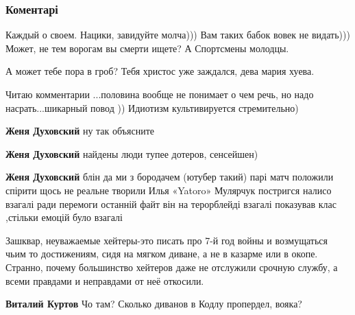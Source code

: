 
 
 
 
 
\subsubsection{Коментарі}

\begin{itemize} %

Каждый о своем. Нацики, завидуйте молча))) Вам таких бабок вовек не видать)))
Может, не тем ворогам вы смерти ищете? А Спортсмены молодцы.

\begin{itemize} %
А может тебе пора в гроб? Тебя христос уже заждался, дева мария хуева.
\end{itemize} %


Читаю комментарии ...половина вообще не понимает о чем речь, но надо
насрать...шикарный повод )) Идиотизм культивируется стремительно)

\begin{itemize} %
\textbf{Женя Духовский} ну так объясните

\textbf{Женя Духовский} найдены люди тупее дотеров, сенсейшен)

\textbf{Женя Духовский} блін да ми з бородачем (ютубер такий) парі матч положили спірити щось не реальне творили Илья «Yatoro» Мулярчук постригся налисо взагалі ради перемоги останній файт він на терорблейді взагалі показував клас ,стільки емоцій було взагалі
\end{itemize} %


Зашквар, неуважаемые хейтеры-это писать про 7-й год войны и возмущаться чьим то
достижениям, сидя на мягком диване, а не в казарме или в окопе. Странно, почему
большинство хейтеров даже не отслужили срочную службу, а всеми правдами и
неправдами от неё откосили.

\begin{itemize} %
\textbf{Виталий Куртов} Чо там? Сколько диванов в Кодлу пропердел, вояка?


\end{itemize}
\end{itemize}
